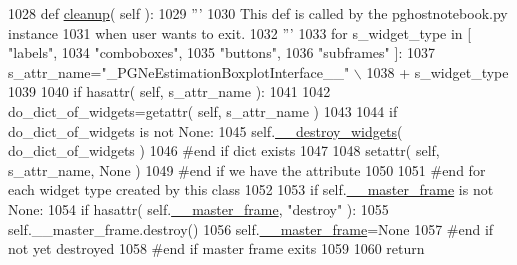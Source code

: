 \begin{DoxyCode}
1028     \textcolor{keyword}{def }\hyperlink{classnegui_1_1pgneestimationboxplotinterface_1_1PGNeEstimationBoxplotInterface_adf723928661375b415aa0038d002089e}{cleanup}( self ):
1029         \textcolor{stringliteral}{'''}
1030 \textcolor{stringliteral}{        This def is called by the pghostnotebook.py instance}
1031 \textcolor{stringliteral}{        when user wants to exit.}
1032 \textcolor{stringliteral}{        '''}
1033         \textcolor{keywordflow}{for} s\_widget\_type \textcolor{keywordflow}{in} [ \textcolor{stringliteral}{"labels"}, 
1034                                     \textcolor{stringliteral}{"comboboxes"}, 
1035                                     \textcolor{stringliteral}{"buttons"}, 
1036                                     \textcolor{stringliteral}{"subframes"} ]:
1037             s\_attr\_name=\textcolor{stringliteral}{"\_PGNeEstimationBoxplotInterface\_\_"} \(\backslash\)
1038                                 +  s\_widget\_type
1039         
1040             \textcolor{keywordflow}{if} hasattr( self, s\_attr\_name ):
1041 
1042                 do\_dict\_of\_widgets=getattr( self, s\_attr\_name )
1043 
1044                 \textcolor{keywordflow}{if} do\_dict\_of\_widgets \textcolor{keywordflow}{is} \textcolor{keywordflow}{not} \textcolor{keywordtype}{None}:
1045                     self.\hyperlink{classnegui_1_1pgneestimationboxplotinterface_1_1PGNeEstimationBoxplotInterface_a4e0743b43a9183f0dabfabf15db34e7e}{\_\_destroy\_widgets}( do\_dict\_of\_widgets )
1046                 \textcolor{comment}{#end if dict exists}
1047 
1048                 setattr( self, s\_attr\_name, \textcolor{keywordtype}{None} )
1049             \textcolor{comment}{#end if we have the attribute}
1050 
1051         \textcolor{comment}{#end for each widget type created by this class}
1052 
1053         \textcolor{keywordflow}{if} self.\hyperlink{classnegui_1_1pgneestimationboxplotinterface_1_1PGNeEstimationBoxplotInterface_a1e1c12ce6b6f404d986b88c2834b623d}{\_\_master\_frame} \textcolor{keywordflow}{is} \textcolor{keywordflow}{not} \textcolor{keywordtype}{None}:
1054             \textcolor{keywordflow}{if} hasattr( self.\hyperlink{classnegui_1_1pgneestimationboxplotinterface_1_1PGNeEstimationBoxplotInterface_a1e1c12ce6b6f404d986b88c2834b623d}{\_\_master\_frame}, \textcolor{stringliteral}{"destroy"} ):
1055                 self.\_\_master\_frame.destroy()
1056                 self.\hyperlink{classnegui_1_1pgneestimationboxplotinterface_1_1PGNeEstimationBoxplotInterface_a1e1c12ce6b6f404d986b88c2834b623d}{\_\_master\_frame}=\textcolor{keywordtype}{None}
1057             \textcolor{comment}{#end if not yet destroyed}
1058         \textcolor{comment}{#end if master frame exits}
1059 
1060         \textcolor{keywordflow}{return}
\end{DoxyCode}


